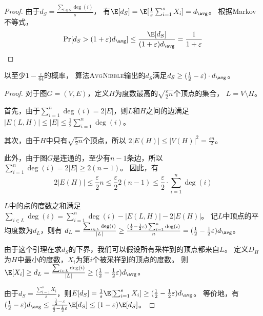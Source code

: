 \documentclass[lang=cn,newtx,10pt,scheme=chinese,chinesefont=nofont,citestyle=gb7714-2015, bibstyle=gb7714-2015]{elegantbook}
\begin{document}
\begin{refsection}
\begin{proof}
    由于$d_S=\frac{\sum_{i\in S}\deg(i)}{s}$，
    有$\E[d_S]=\E[\frac{1}{s}\sum_{i=1}^sX_i]=d_\avg$。
    根据Markov不等式，
    \[
    \Pr[d_S>(1+\varepsilon)d_\avg]\le\frac{\E[d_S]}{(1+\varepsilon)d_\avg}=\frac{1}{1+\varepsilon}
    \]
\end{proof}

\begin{lemma}\label{lem:nibble-B}
    以至少$1-\frac{\varepsilon}{64}$的概率，
    算法\textsc{AvgNibble}输出的$d_S$满足$d_S\ge(\frac{1}{2}-\varepsilon)\cdot d_\avg$。
\end{lemma}
\begin{proof}
    对于图$G=(V,E)$，定义$H$为度数最高的$\sqrt{\frac{\varepsilon}{2}n}$个顶点的集合，
    $L=V\setminus H$。

    首先，由于$\sum_{i=1}^n\deg(i)=2|E|$，则$L$和$H$之间的边满足
    $|E(L,H)|\le|E|\le\frac{1}{2}\sum_{i=1}^n\deg(i)$。

    其次，由于$H$中只有$\sqrt{\frac{\varepsilon}{2}n}$个顶点，所以
    $2|E(H)|\le|V(H)|^2=\frac{\varepsilon n}{2}$。

    此外，由于图$G$是连通的，至少有$n-1$条边，所以$\sum_{i=1}^n\deg(i)=2|E|\ge2(n-1)$。
    因此，有
    \[
    2|E(H)|\le\frac{\varepsilon}{2}n\le\frac{\varepsilon}{2}2(n-1)
    \le\frac{\varepsilon}{2}\cdot\sum_{i=1}^n\deg(i)
    \]

    $L$中的点的度数之和满足$\sum_{i\in L}\deg(i)=\sum_{i=1}^n\deg(i)-|E(L,H)|-2|E(H)|$。
    记$L$中顶点的平均度数为$d_L$，则有
    $d_L=\frac{\sum_{i\in L}\deg(i)}{|L|}\ge\frac{(\frac{1}{2}-\frac{1}{2}\varepsilon)\sum_{i=1}^n\deg(i)}{n}=(\frac{1}{2}-\frac{1}{2}\varepsilon)d_\avg$。

    由于这个引理在求$d_S$的下界，我们可以假设所有采样到的顶点都来自$L$。
    定义$D_H$为$H$中最小的度数，$X_i$为第$i$个被采样到的顶点的度数。
    则$\E[X_i]\ge d_L=\frac{\sum_{i\in L}\deg(i)}{|L|}\ge(\frac{1}{2}-\frac{1}{2}\varepsilon)d_\avg$。
    
    由于$d_S=\frac{\sum_{i=1}^sX_i}{s}$，则$E[d_S]=\frac{1}{s}\E[\sum_{i=1}^sX_i]\ge(\frac{1}{2}-\frac{1}{2}\varepsilon)d_\avg$。
    等价地，有$(\frac{1}{2}-\varepsilon)d_\avg\le\frac{\frac{1}{2}-\varepsilon}{\frac{1}{2}-\frac{1}{2}\varepsilon}\E[d_S]\le(1-\varepsilon)\E[d_S]$。


\end{proof}
\end{refsection}
\end{document}
